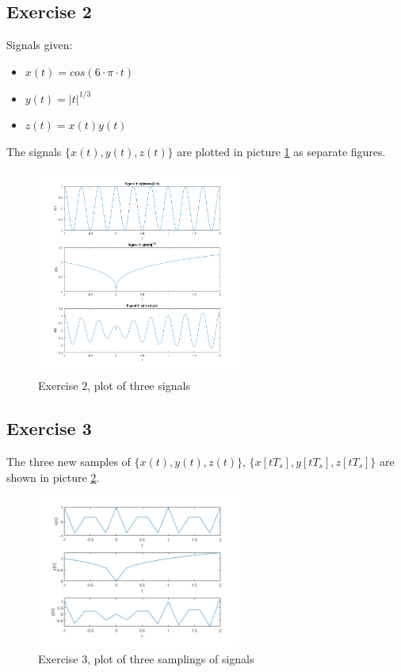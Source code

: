 \documentclass[a4paper]{article}
\begin{document}
\subsection{Exercise 2}
Signals given:
\begin{itemize}
    \item $x(t) = cos(6 \cdot \pi \cdot t)$ \\
    \item $y(t) = |t|^{1/3}$ \\
    \item $z(t) = x(t)y(t)$ \\
\end{itemize}
The signals $\{x(t),y(t),z(t)\}$ are plotted in picture \ref{fig:2} as separate figures.
\begin{figure}
    \centering
    \includegraphics[width=0.6\textwidth]{2.png}
    \caption{Exercise 2, plot of three signals}
    \label{fig:2}
\end{figure}
\subsection{Exercise 3}
The three new samples of $\{x(t),y(t),z(t)\}$, $\{x[t T_s],y[t T_s],z[t T_s]\}$ are shown in picture \ref{fig:3}.
\begin{figure}
    \centering
    \includegraphics[width=0.6\textwidth]{3.png}
    \caption{Exercise 3, plot of three samplings of signals}
    \label{fig:3}
\end{figure}
\end{document}
